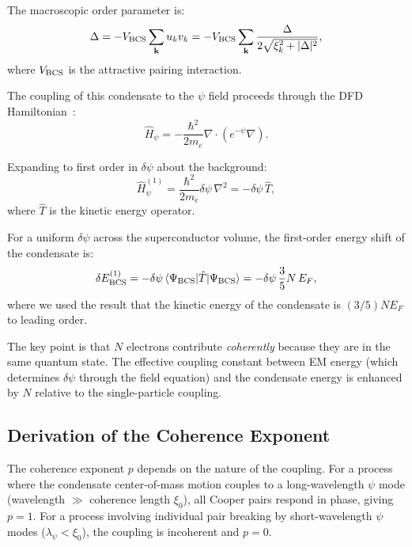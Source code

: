 \documentclass[twocolumn,prl,superscriptaddress,nofootinbib,longbibliography,floatfix]{revtex4-2}
\begin{document}
The macroscopic order parameter is:
\begin{equation}
\Delta = -V_{\rm BCS}\sum_{\mathbf{k}} u_k v_k
= -V_{\rm BCS}\sum_{\mathbf{k}}
\frac{\Delta}{2\sqrt{\xi_k^2 + |\Delta|^2}},
\label{eq:gap-equation}
\end{equation}
where $V_{\rm BCS}$ is the attractive pairing interaction.

The coupling of this condensate to the $\psi$ field proceeds through
the DFD Hamiltonian~\cite{Alcock2025Penrose}:
\begin{equation}
\hat{H}_\psi = -\frac{\hbar^2}{2m_e}\nabla\cdot(e^{-\psi}\nabla).
\label{eq:H-psi}
\end{equation}

Expanding to first order in $\delta\psi$ about the background:
\begin{equation}
\hat{H}_\psi^{(1)} = \frac{\hbar^2}{2m_e}\delta\psi\,\nabla^2
= -\delta\psi\,\hat{T},
\label{eq:H-psi-1}
\end{equation}
where $\hat{T}$ is the kinetic energy operator.

For a uniform $\delta\psi$ across the superconductor volume, the
first-order energy shift of the condensate is:
\begin{equation}
\delta E_{\rm BCS}^{(1)} = -\delta\psi\,
\langle\Psi_{\rm BCS}|\hat{T}|\Psi_{\rm BCS}\rangle
= -\delta\psi\,\frac{3}{5}N\,E_F,
\label{eq:BCS-energy-shift}
\end{equation}
where we used the result that the kinetic energy of the condensate is
$(3/5)N E_F$ to leading order.

The key point is that $N$ electrons contribute \emph{coherently}
because they are in the same quantum state.  The effective coupling
constant between EM energy (which determines $\delta\psi$ through the
field equation) and the condensate energy is enhanced by $N$ relative
to the single-particle coupling.

\subsection{Derivation of the Coherence Exponent}

The coherence exponent $p$ depends on the nature of the coupling.
For a process where the condensate center-of-mass motion couples to a
long-wavelength $\psi$ mode (wavelength $\gg$ coherence length $\xi_0$),
all Cooper pairs respond in phase, giving $p = 1$.  For a process
involving individual pair breaking by short-wavelength $\psi$ modes
($\lambda_\psi < \xi_0$), the coupling is incoherent and $p = 0$.
\end{document}
